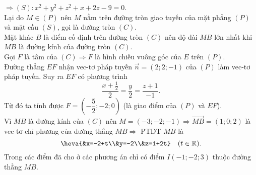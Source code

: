 \begin{ex}
{		$\Rightarrow (S)\colon x^2 + y^2 + z^2 + x + 2z - 9 = 0$.\\
		Lại do $M \in (P)$ nên $M$ nằm trên đường tròn giao tuyến của mặt phẳng $(P)$ và mặt cầu $(S)$, gọi là đường tròn $(C)$.\\
		Mặt khác $B$ là điểm cố định trên đường tròn $(C)$ nên độ dài $MB$ lớn nhất khi $MB$ là đường kính của đường tròn $(C)$.\\
		Gọi $F$ là tâm của $(C) \Rightarrow F$ là hình chiếu vuông góc của $E$ trên $(P)$.\\
		Đường thẳng $EF$ nhận vec-tơ pháp tuyến $\overrightarrow{n} = (2; 2; -1)$ của $(P)$ làm vec-tơ pháp tuyến. Suy ra $EF$ có phương trình
		$$ \dfrac{x + \frac{1}{2}}{2} = \dfrac{y}{2} = \dfrac{z + 1}{-1}.$$
		Từ đó ta tính được $F = \left( -\dfrac{5}{2}; -2; 0 \right)$ (là giao điểm của $(P)$ và $EF$).\\
		Vì $MB$ là đường kính của $(C)$ nên $M = (-3; -2; -1) \Rightarrow \overrightarrow{MB} = (1; 0; 2)$ là vec-tơ chỉ phương của đường thẳng $MB \Rightarrow$ PTĐT $MB$ là 
		$$\heva{&x=-2+t\\&y=-2\\&z=1+2t} \quad (t \in \mathbb{R}).$$
		Trong các điểm đã cho ở các phương án chỉ có điểm $I (-1; -2; 3)$  thuộc đường thẳng $MB$.	
	}
\end{ex}
